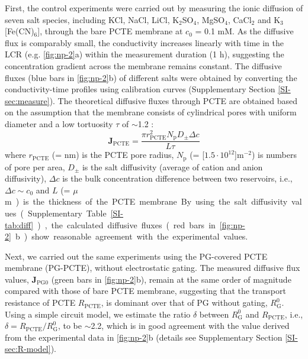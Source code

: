 First, the control experiments were carried out by measuring the ionic
diffusion of seven salt species, including KCl, NaCl, LiCl,
K$_{2}$SO$_{4}$, MgSO$_{4}$, CaCl$_{2}$ and K$_{3}$[Fe(CN)$_{6}$],
through the bare PCTE membrane at $c_{0}$ = 0.1 mM. As the diffusive
flux is comparably small, the conductivity increases linearly with
time in the LCR (e.g.  \autoref{fig:np-2}a) within the measurement
duration (1 h), suggesting the concentration gradient across the
membrane remains constant. The diffusive fluxes (blue bars in 
\autoref{fig:np-2}b) of different salts were obtained by converting the
conductivity-time profiles using calibration curves (Supplementary
Section \autoref{SI-sec:measure}). The theoretical diffusive fluxes
through PCTE are obtained based on the assumption that the membrane
consists of cylindrical pores with uniform diameter and a low
tortuosity $\tau$ of $\sim{}$1.2 \cite{O_Hern_2012_defect}:
\begin{equation}
  \label{eq:np-j-pcte}
  \boldsymbol{J}_{\mathrm{PCTE}} = \frac{\pi r_{\mathrm{PCTE}}^{2} N_{\mathrm{p}} D_{\mathrm{\pm}} \Delta c}{L \tau}
\end{equation}
{where $r_{\mathrm{PCTE}}$ (= \unit[200]{nm}) is the PCTE pore radius, $N_{\mathrm{p}}$  (= \unit[$1.5\cdot10^{12}$]{m$^{-2}$}) is
numbers of pore per area, $D_{\mathrm{\pm}}$ is the salt diffusivity
(average of cation and anion diffusivity), $\Delta c$ is the bulk
concentration difference between two reservoirs, i.e.,
$\Delta c \sim c_{0}$ and $L$ (= \unit[24]{$\mu$m}) is the thickness of the PCTE membrane.
By using the salt diffusivity values (Supplementary Table
\autoref{SI-tab:diff}), the calculated diffusive fluxes (red bars in
 \autoref{fig:np-2}b) show reasonable agreement with the experimental
values.}

Next, we carried out the same experiments using the PG-covered PCTE
membrane (PG-PCTE), without electrostatic gating. The measured
diffusive flux values, $\boldsymbol{J}_{\mathrm{PG0}}$ (green bars in
 \autoref{fig:np-2}b), remain at the same order of magnitude compared
with those of bare PCTE membrane, suggesting that the transport
resistance of PCTE $R_{\mathrm{PCTE}}$, is dominant over that of PG
without gating, $R_{\mathrm{G}}^{0}$. Using a simple circuit model, we
estimate the ratio $\delta$ between $R_{\mathrm{G}}^{0}$ and
$R_{\mathrm{PCTE}}$, i.e.,
$\delta = R_{\mathrm{PCTE}}/R_{\mathrm{G}}^{0}$, to be $\sim$2.2,
which is in good agreement with the value derived from the
experimental data in  \autoref{fig:np-2}b (details see Supplementary
Section \autoref{SI-sec:R-model}).


